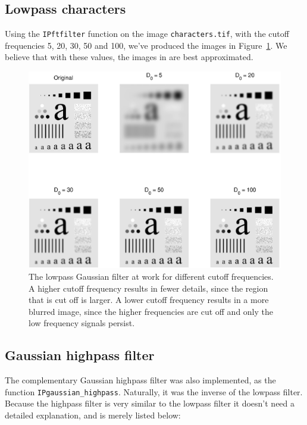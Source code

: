 \subsection{Lowpass characters}
Using the \texttt{IPftfilter} function on the image \texttt{characters.tif}, with the cutoff frequencies 5, 20, 30, 50 and 100, we've produced the images in Figure~\ref{fig:lowChars}.
We believe that with these values, the images in \cite[Figure~4.48]{gonzalez2002digital} are best approximated.
\begin{figure}[ht]
 \centering
 \includegraphics[width=\linewidth]{characters_low_pass.eps}
 \caption{
		The lowpass Gaussian filter at work for different cutoff frequencies.
		A higher cutoff frequency results in fewer details, since the region that is cut off is larger.
		A lower cutoff frequency results in a more blurred image, since the higher frequencies are cut off and only the low frequency signals persist.
	}
 \label{fig:lowChars}
\end{figure}

\clearpage

\subsection{Gaussian highpass filter}
The complementary Gaussian highpass filter was also implemented, as the function \texttt{IPgaussian\_highpass}.
Naturally, it was the inverse of the lowpass filter.
Because the highpass filter is very similar to the lowpass filter it doesn't need a detailed explanation, and is merely listed below:

